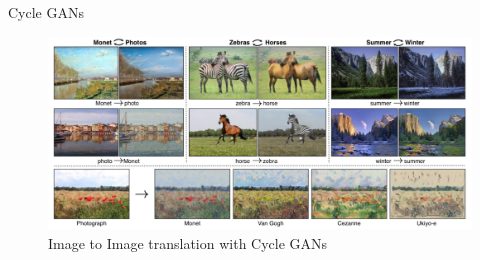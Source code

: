 \begin{frame}[allowframebreaks]{Cycle GANs}
\framebreak
\begin{figure}
    \centering
    \includegraphics[height=0.9\textheight, width=\textwidth, keepaspectratio]{images/gan/cycle_gan_6.png}
    \caption{Image to Image translation with Cycle GANs}
\end{figure}
\end{frame}